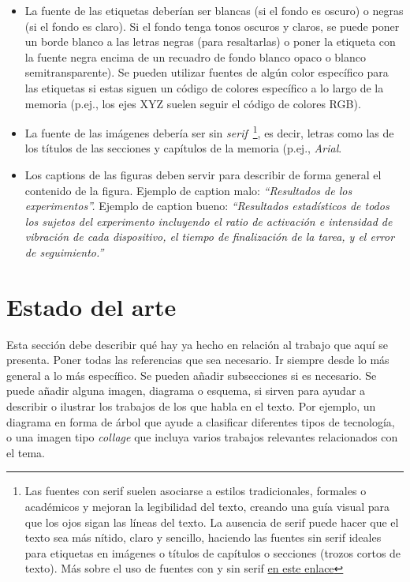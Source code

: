 \documentclass[a4paper,11pt,reqno,twoside]{memoir}
\begin{document}
\begin{itemize}
    \item La fuente de las etiquetas deberían ser blancas (si el fondo es oscuro) o negras (si el fondo es claro). Si el fondo tenga tonos oscuros y claros, se puede poner un borde blanco a las letras negras (para resaltarlas) o poner la etiqueta con la fuente negra encima de un recuadro de fondo blanco opaco o blanco semitransparente). Se pueden utilizar fuentes de algún color específico para las etiquetas si estas siguen un código de colores específico a lo largo de la memoria (p.ej., los ejes XYZ suelen seguir el código de colores RGB).
    \item La fuente de las imágenes debería ser sin \textit{serif}~\footnote{Las fuentes con serif suelen asociarse a estilos tradicionales, formales o académicos y mejoran la legibilidad del texto, creando una guía visual para que los ojos sigan las líneas del texto. La ausencia de serif puede hacer que el texto sea más nítido, claro y sencillo, haciendo las fuentes sin serif ideales para etiquetas en imágenes o títulos de capítulos o secciones (trozos cortos de texto). Más sobre el uso de fuentes con y sin serif \href{https://www.linkedin.com/advice/1/what-some-advantages-disadvantages-using-serif?lang=es&originalSubdomain=es}{en este enlace}}, es decir, letras como las de los títulos de las secciones y capítulos de la memoria (p.ej., \textit{Arial}. 
    \item Los captions de las figuras deben servir para describir de forma general el contenido de la figura. Ejemplo de caption malo: \textit{``Resultados de los experimentos''.} Ejemplo de caption bueno: \textit{``Resultados estadísticos de todos los sujetos del experimento incluyendo el ratio de activación e intensidad de vibración de cada dispositivo, el tiempo de finalización de la tarea, y el error de seguimiento.''}
\end{itemize}

\section{Estado del arte}
\label{sec:estado_del_arte}

Esta sección debe describir qué hay ya hecho en relación al trabajo que aquí se presenta. Poner todas las referencias que sea necesario. Ir siempre desde lo más general a lo más específico. Se pueden añadir subsecciones si es necesario. Se puede añadir alguna imagen, diagrama o esquema, si sirven para ayudar a describir o ilustrar los trabajos de los que habla en el texto. Por ejemplo, un diagrama en forma de árbol que ayude a clasificar diferentes tipos de tecnología, o una imagen tipo \textit{collage} que incluya varios trabajos relevantes relacionados con el tema.
\end{document}
